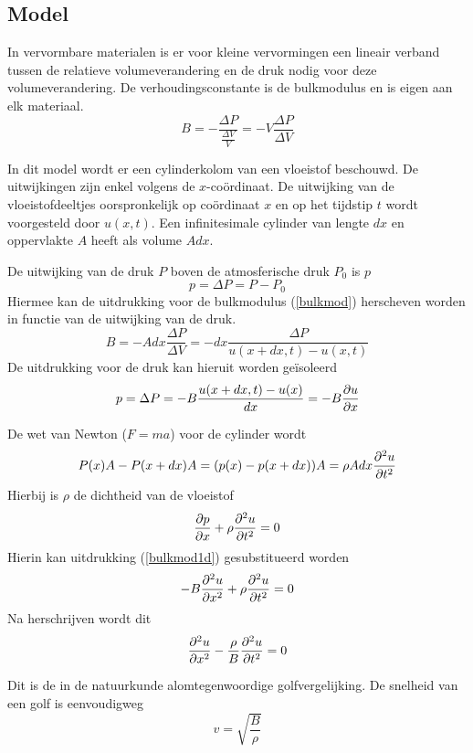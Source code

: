 \subsection{Model}

In vervormbare materialen is er voor kleine vervormingen een lineair verband 
tussen de relatieve volumeverandering en de druk nodig voor deze 
volumeverandering. De verhoudingsconstante is de bulkmodulus en is eigen aan 
elk materiaal.
\begin{equation}
\label{bulkmod}
B = -\frac{\Delta P}{\frac{\Delta V}{V}} = - V \frac{\Delta P}{\Delta V}
\end{equation}


In dit model wordt er een cylinderkolom van een vloeistof beschouwd. De 
uitwijkingen zijn enkel volgens de $x$-co\"ordinaat. De uitwijking van de 
vloeistofdeeltjes oorspronkelijk op co\"ordinaat $x$ en op het tijdstip $t$ 
wordt voorgesteld door $u(x,t)$. Een infinitesimale cylinder van lengte $dx$ en 
oppervlakte $A$ heeft als volume $A dx$. 

De uitwijking van de druk $P$ boven de atmosferische druk $P_0$ is $p$
$$
p = \Delta P = P - P_0
$$
Hiermee kan de uitdrukking voor de bulkmodulus (\ref{bulkmod}) herscheven 
worden in functie van de uitwijking van de druk.
$$
B = -A dx \frac{\Delta P}{\Delta V} = -dx \frac{\Delta P}{ u(x+dx,t)-u(x,t)}
$$
De uitdrukking voor de druk kan hieruit worden ge\"isoleerd
\begin{equation}
\label{bulkmod1d}
p = \Delta P = -B \frac{u(x+dx,t)-u(x)}{dx} = -B \frac{\partial u}{\partial x}
\end{equation}

De wet van Newton ($F = ma$) voor de cylinder wordt
$$
P(x)A - P(x+dx)A = (p(x) - p(x+dx))A = \rho A dx \frac{\partial^2 u}{\partial t^2}
$$
Hierbij is $\rho$ de dichtheid van de vloeistof
$$
\frac{\partial p}{\partial x} + \rho \frac{\partial^2 u}{\partial t^2} = 0
$$
Hierin kan uitdrukking (\ref{bulkmod1d}) gesubstitueerd worden
$$
-B\frac{\partial^2 u}{\partial x^2} + \rho \frac{\partial^2 u}{\partial t^2} = 0
$$
Na herschrijven wordt dit
\begin{equation}
\label{waveeq}
\frac{\partial^2 u}{\partial x^2} - \frac{\rho}{B} \frac{\partial^2 u}{\partial t^2} = 0
\end{equation}

Dit is de in de natuurkunde alomtegenwoordige golfvergelijking. De snelheid van 
een golf is eenvoudigweg
\begin{equation}
\label{speedofsound}
v = \sqrt{\frac{B}{\rho}}
\end{equation}

